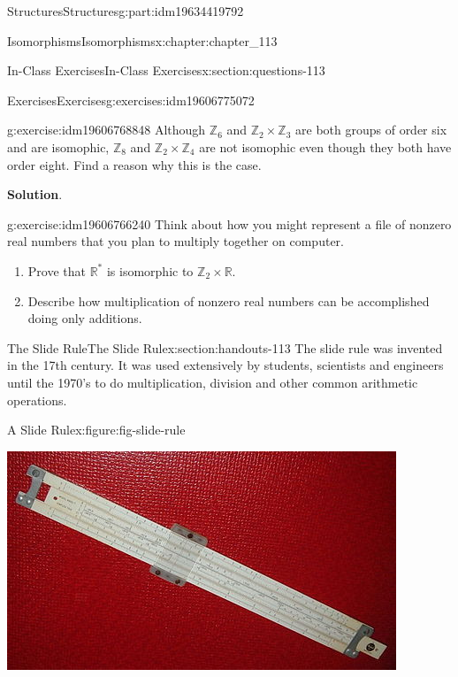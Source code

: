 \documentclass[oneside,10pt,]{book}
\newcommand{\blocktitlefont}{\relax}
\numberwithin{equation}{section}
\begin{document}
\begin{partptx}{Structures}{}{Structures}{}{}{g:part:idm19634419792}
\begin{chapterptx}{Isomorphisms}{}{Isomorphisms}{}{}{x:chapter:chapter_113}
\begin{sectionptx}{In-Class Exercises}{}{In-Class Exercises}{}{}{x:section:questions-113}
\begin{exercises-subsection-numberless}{Exercises}{}{Exercises}{}{}{g:exercises:idm19606775072}
\begin{exercisegroup}
\begin{divisionexerciseeg}{3}{}{}{g:exercise:idm19606768848}%
Although \(\mathbb{Z}_6\) and \(\mathbb{Z}_2 \times \mathbb{Z}_3\) are both groups of order six and are isomophic, \(\mathbb{Z}_8\) and \(\mathbb{Z}_2 \times \mathbb{Z}_4\) are not isomophic even though they both have order eight.  Find a reason why this is the case.%
\par\smallskip%
\noindent\textbf{\blocktitlefont Solution}.\hypertarget{g:solution:idm19606768720}{}\quad{}%
\end{divisionexerciseeg}%
\begin{divisionexerciseeg}{4}{}{}{g:exercise:idm19606766240}%
Think about how you might represent a file of nonzero real numbers that you plan to multiply together on computer.%
\begin{enumerate}[label=(\alph*)]
\item{}Prove that \(\mathbb{R}^*\) is isomorphic to \(\mathbb{Z}_2 \times  \mathbb{R}\).%
\item{}Describe how multiplication of nonzero real numbers can be accomplished doing only additions.%
\end{enumerate}
%
\end{divisionexerciseeg}%
\end{exercisegroup}
\par\medskip\noindent
\end{exercises-subsection-numberless}
\end{sectionptx}
%
%
\typeout{************************************************}
\typeout{************************************************}
%
\begin{sectionptx}{The Slide Rule}{}{The Slide Rule}{}{}{x:section:handouts-113}
The slide rule was invented in the 17th century.  It was used extensively  by students, scientists and engineers until the 1970's to do multiplication, division and other common arithmetic operations.%
\begin{figureptx}{A Slide Rule}{x:figure:fig-slide-rule}{}%
\begin{image}{0.25}{0.5}{0.25}%
\includegraphics[width=\linewidth]{images/fig-side-rule.jpg}

\end{image}
\end{figureptx}
\end{sectionptx}
\end{chapterptx}
\end{partptx}
\end{document}
